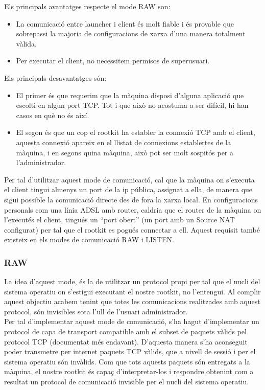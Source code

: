 Els principals avantatges respecte el mode RAW son: \\
\begin{itemize}
    \item La comunicació entre launcher i client és molt fiable i és provable que sobrepassi la majoria de 
        configuracions de xarxa d'una manera totalment vàlida.
    \item Per executar el client, no necessitem permisos de superusuari.
\end{itemize}

Els principals desavantatges són: \\
\begin{itemize}
    \item El primer és que requerim que la màquina disposi d'alguna aplicació que escolti en algun port 
        TCP. Tot i que això no acostuma a ser difícil, hi han casos en què no és així.
    \item El segon és que un cop el rootkit ha establer la connexió TCP amb el client, aquesta connexió
        apareix en el llistat de connexions establertes de la màquina, i en segons quina màquina, això
        pot ser molt sospitós per a l'administrador.
\end{itemize}

Per tal d'utilitzar aquest mode de comunicació, cal que la màquina on s'executa el client tingui almenys
un port de la ip pública, assignat a ella, de manera que sigui possible la comunicació directe des de fora
la xarxa local. En configuracions personals com una línia ADSL amb router, caldria que el router de la màquina
on l'executés el client, tingués un ``port obert'' (un port amb un Source NAT configurat) per tal que el rootkit es pogués 
connectar a ell. Aquest requisit també existeix en els modes de comunicació RAW i LISTEN. \\

\subsubsection{RAW}

La idea d'aquest mode, és la de utilitzar un protocol propi per tal que el nucli del sistema operatiu on
s'estigui executant el nostre rootkit, no l'entengui. Al complir aquest objectiu acabem tenint que totes les
comunicacions realitzades amb aquest protocol, són invisibles sota l'ull de l'usuari administrador. \\

Per tal d'implementar aquest mode de comunicació, s'ha hagut d'implementar un protocol de capa de transport 
compatible amb el subset de paquets vàlids pel protocol TCP (documentat més endavant). D'aquesta manera s'ha 
aconseguit poder transmetre per internet paquets TCP vàlids, que a nivell de sessió i per el sistema operatiu són invàlids. 
Com que tots aquests paquets són entregats a la màquina, el nostre rootkit és capaç d'interpretar-los i 
respondre obtenint com a resultat un protocol de comunicació invisible per el nucli del sistema operatiu. \\

